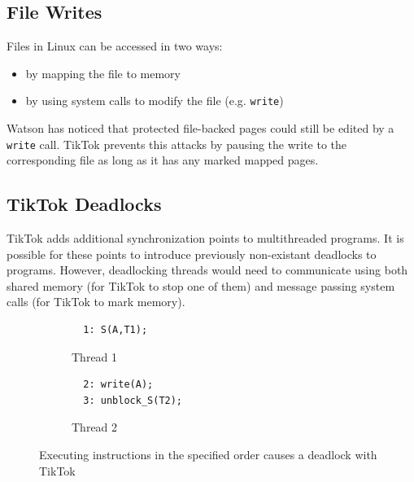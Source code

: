 \subsection{File Writes}
\label{subsec:filewrites}
Files in Linux can be accessed in two ways:
\begin{itemize}
    \item by mapping the file to memory
    \item by using system calls to modify the file (e.g. \texttt{write})
\end{itemize}

Watson has noticed that protected file-backed pages could still be edited by a \texttt{write} call. TikTok prevents this attacks
by pausing the write to the corresponding file as long as it has any marked mapped pages.

\subsection{TikTok Deadlocks}
\label{subsec:deadlocks}
TikTok adds additional synchronization points to multithreaded programs. It is possible for these points to introduce 
previously non-existant deadlocks to programs. However, deadlocking threads would need to communicate using both 
shared memory (for TikTok to stop one of them) and message passing system calls (for TikTok to mark memory).


\begin{figure}
  \centering
  \begin{subfigure}[b]{0.45\linewidth}
  \begin{minipage}{\linewidth}
  \begin{lstlisting}
  1: S(A,T1);  
  \end{lstlisting}
  \end{minipage}
  \caption{Thread 1}
  \end{subfigure}
  \hfill
  \begin{subfigure}[b]{0.45\linewidth}
  \begin{minipage}{\linewidth}
  \begin{lstlisting}
  2: write(A);
  3: unblock_S(T2);
  \end{lstlisting}  
  \end{minipage}
  \caption{Thread 2}
  \end{subfigure}
  \caption{Executing instructions in the specified order causes a deadlock with TikTok}
  \label{fig:deadlock}
\end{figure}


